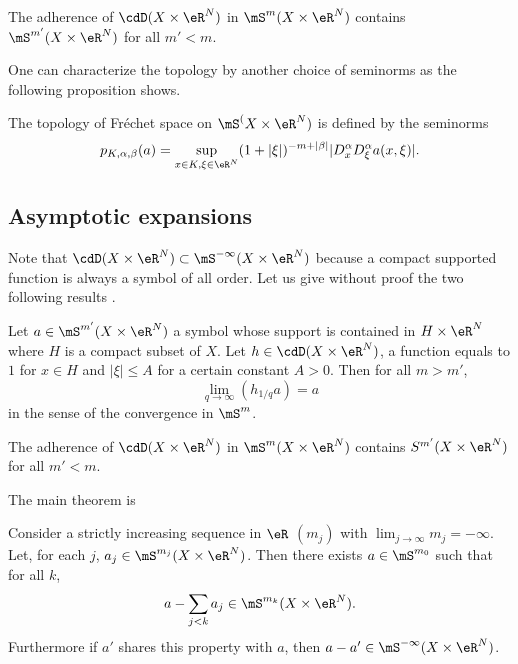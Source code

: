 \begin{lemma} 
The adherence of $\cdD(X\times\eR^N)$ in $\mS^m(X\times \eR^N)$ contains $\mS^{m'}(X\times\eR^N)$ for all $m'<m$.
\label{lem:DadhS}
\end{lemma}

One can characterize the topology by another choice of seminorms as the following proposition shows.

\begin{proposition}
The topology of Fréchet space on $\mS^(X\times\eR^N)$ is defined by the seminorms
\[ 
   p_{K,\alpha,\beta}(a)=\sup_{x\in K,\xi\in\eR^N}(1+|\xi|)^{-m+|\beta|}| D_x^{\alpha}D_{\xi}^{\alpha}a(x,\xi) |.
\]
 \label{prop:topo_alter}
\end{proposition}

\subsection{Asymptotic expansions}

Note that $\cdD(X\times \eR^N)\subset\mS^{-\infty}(X\times\eR^N)$ because a compact supported function is always a symbol of all order. Let us give without proof the two following results \cite{Dieu7}.


\begin{lemma} 
Let $a\in\mS^{m'}(X\times\eR^N)$ a symbol whose support is contained in $H\times\eR^N$ where $H$ is a compact subset of $X$. Let $h\in\cdD(X\times\eR^N)$, a function equals to $1$ for $x\in H$ and $|\xi|\leq A$ for a certain constant $A>0$. Then for all $m>m'$,
\[ 
  \lim_{q\to\infty}(h_{1/q}a)=a
\]
in the sense of the convergence in $\mS^m$.
\label{lem:limha}
\end{lemma}

\begin{proposition}
The adherence of $\cdD(X\times\eR^N)$ in $\mS^m(X\times\eR^N)$ contains $S^{m'}(X\times\eR^N)$ for all $m'<m$.
\end{proposition}

The main theorem is

\begin{theorem} 
Consider a strictly increasing sequence in $\eR$ $(m_j)$ with $\lim_{j\to\infty}m_j=-\infty$. Let, for each $j$, $a_j\in\mS^{m_j}(X\times\eR^N)$. Then there exists $a\in \mS^{m_0}$ such that for all $k$,
\begin{equation}  \label{eq:dev_ass}
a-\sum_{j<k}a_j\in\mS^{m_k}(X\times\eR^N).
\end{equation}
Furthermore if $a'$ shares this property with $a$, then $a-a'\in\mS^{-\infty}(X\times\eR^N)$.
\label{tho:dev_ass}
\end{theorem}


